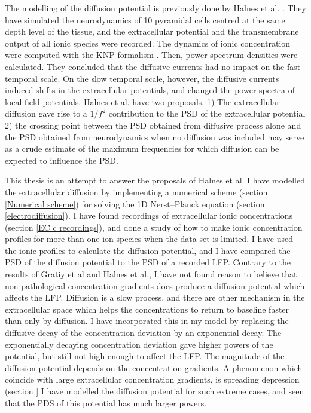 \documentclass{article}
\begin{document}
The modelling of the diffusion potential is previously done by Halnes et al. \cite{Halnes2016}. They have simulated the neurodynamics of 10 pyramidal cells centred at the same depth level of the tissue, and the extracellular potential and the transmembrane output of all ionic species were recorded. The dynamics of ionic concentration were computed with the KNP-formalism \cite{Halnes}. Then, power spectrum densities were calculated. They concluded that the diffusive currents had no impact on the fast temporal scale. On the slow temporal scale, however, the diffusive currents induced shifts in the extracellular potentials, and changed the power spectra of local field potentials. Halnes et al. have two proposals. 1) The extracellular diffusion gave rise to a $1/f^2$ contribution to the PSD of the extracellular potential 2) the crossing point between the PSD obtained from diffusive process alone and the PSD obtained from neurodynamics when no diffusion was included may serve as a crude estimate of the maximum frequencies for which diffusion can be expected to influence the PSD. 


This thesis is an attempt to answer the proposals of Halnes et al. I have modelled the extracellular diffusion by implementing a numerical scheme (section \ref{Numerical scheme}) for solving the 1D  Nerst--Planck equation (section  \ref{electrodiffusion}). I have found recordings of extracellular ionic concentrations (section \ref{EC c recordings}), and done a study of how to make ionic concentration profiles for more than one ion species when the data set is limited. I have used the ionic profiles to calculate the diffusion potential, and I have compared the PSD of the diffusion potential to the PSD of a recorded LFP.  Contrary to the results of Gratiy et al and Halnes et al., I have not found reason to believe that non-pathological concentration gradients does produce a diffusion potential which affects the LFP. Diffusion is a slow process, and there are other mechanism in the extracellular space which helps the concentrations to return to baseline faster than only by diffusion. I have incorporated this in my model by replacing the diffusive decay of the concentration deviation by an exponential decay. The exponentially decaying concentration deviation gave higher powers of the potential, but still not high enough to affect the LFP. The magnitude of the diffusion potential depends on the concentration gradients. A phenomenon which coincide with large extracellular concentration gradients, is spreading depression (section ] I have modelled the diffusion potential for such extreme cases, and seen that the PDS of this potential has much larger powers. 
\end{document}
